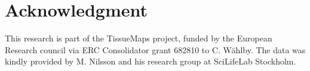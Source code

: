\documentclass[10pt,journal]{IEEEtran}
\begin{document}
\section*{Acknowledgment}
This research is part of the TissueMaps project, funded by the European Research council via ERC Consolidator grant 682810 to C. W{\"a}hlby. The data was kindly provided by M. Nilsson and his research group at SciLifeLab Stockholm.








\end{document}
